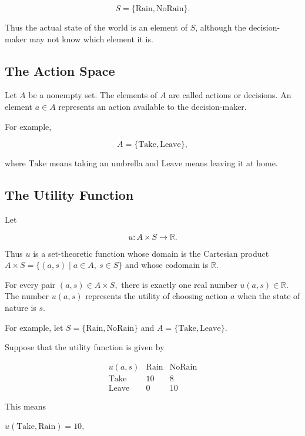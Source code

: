 \documentclass[10pt,a4paper]{book}
\begin{document}
$$
    S=\{\mathrm{Rain},\mathrm{NoRain}\}.
$$

Thus the actual state of the world is an element of \(S\), although the decision-maker may not know which element it is.

\subsection{The Action Space}

Let \(A\) be a nonempty set. The elements of \(A\) are called actions or decisions. An element \(a\in A\) represents an action available to the decision-maker.

For example,

$$
    A=\{\mathrm{Take},\mathrm{Leave}\},
$$

where \(\mathrm{Take}\) means taking an umbrella and \(\mathrm{Leave}\) means leaving it at home.



\subsection{The Utility Function}

Let

$$
    u:A\times S\longrightarrow\mathbb R.
$$

Thus \(u\) is a set-theoretic function whose domain is the Cartesian product
$
    A\times S
    =
    \{(a,s)\mid a\in A,\ s\in S\}
$
and whose codomain is \(\mathbb R\).

For every pair
$
    (a,s)\in A\times S,
$
there is exactly one real number
$
    u(a,s)\in\mathbb R.
$
The number \(u(a,s)\) represents the utility of choosing action \(a\) when the state of nature is \(s\).

For example, let
$
    S=\{\mathrm{Rain},\mathrm{NoRain}\}
$
and
$
    A=\{\mathrm{Take},\mathrm{Leave}\}.
$

Suppose that the utility function is given by

$$
    \begin{array}{c|cc}
        u(a,s)         & \mathrm{Rain} & \mathrm{NoRain} \\
        \hline
        \mathrm{Take}  & 10            & 8               \\
        \mathrm{Leave} & 0             & 10
    \end{array}
$$

This means

$
    u(\mathrm{Take},\mathrm{Rain})=10,
$
\end{document}
